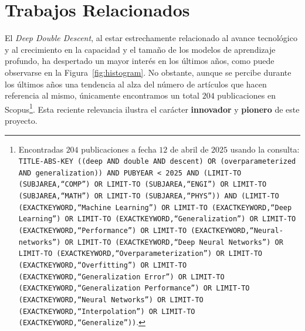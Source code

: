 
\chapter{Trabajos Relacionados}\label{sec:evolucion-ddd}

El \emph{Deep Double Descent}, al estar estrechamente relacionado al avance tecnológico y al crecimiento en la capacidad y el tamaño de los modelos de aprendizaje profundo, ha despertado un mayor interés en los últimos años, como puede observarse en la Figura~\ref{fig:histogram}. No obstante, aunque se percibe durante los últimos años una tendencia al alza del número de artículos que hacen referencia al mismo, únicamente encontramos un total $204$ publicaciones en Scopus\footnote{\label{nota:scopus}Encontradas $204$ publicaciones a fecha $12$ de abril de $2025$ usando la consulta:  
\texttt{TITLE-ABS-KEY ((deep AND double AND descent) OR (overparameterized AND generalization)) AND PUBYEAR < 2025 AND (LIMIT-TO (SUBJAREA,\textquotedblleft COMP\textquotedblright) OR LIMIT-TO (SUBJAREA,\textquotedblleft ENGI\textquotedblright) OR LIMIT-TO (SUBJAREA,\textquotedblleft MATH\textquotedblright) OR LIMIT-TO (SUBJAREA,\textquotedblleft PHYS\textquotedblright)) AND (LIMIT-TO (EXACTKEYWORD,\textquotedblleft Machine Learning\textquotedblright) OR LIMIT-TO (EXACTKEYWORD,\textquotedblleft Deep Learning\textquotedblright) OR LIMIT-TO (EXACTKEYWORD,\textquotedblleft Generalization\textquotedblright) OR LIMIT-TO (EXACTKEYWORD,\textquotedblleft Performance\textquotedblright) OR LIMIT-TO (EXACTKEYWORD,\textquotedblleft Neural-networks\textquotedblright) OR LIMIT-TO (EXACTKEYWORD,\textquotedblleft Deep Neural Networks\textquotedblright) OR LIMIT-TO (EXACTKEYWORD,\textquotedblleft Overparameterization\textquotedblright) OR LIMIT-TO (EXACTKEYWORD,\textquotedblleft Overfitting\textquotedblright) OR LIMIT-TO (EXACTKEYWORD,\textquotedblleft Generalization Error\textquotedblright) OR LIMIT-TO (EXACTKEYWORD,\textquotedblleft Generalization Performance\textquotedblright) OR LIMIT-TO (EXACTKEYWORD,\textquotedblleft Neural Networks\textquotedblright) OR LIMIT-TO (EXACTKEYWORD,\textquotedblleft Interpolation\textquotedblright) OR LIMIT-TO (EXACTKEYWORD,\textquotedblleft Generalize\textquotedblright))}.}. Esta reciente relevancia ilustra el carácter \textbf{innovador} y \textbf{pionero} de este proyecto.\newline


